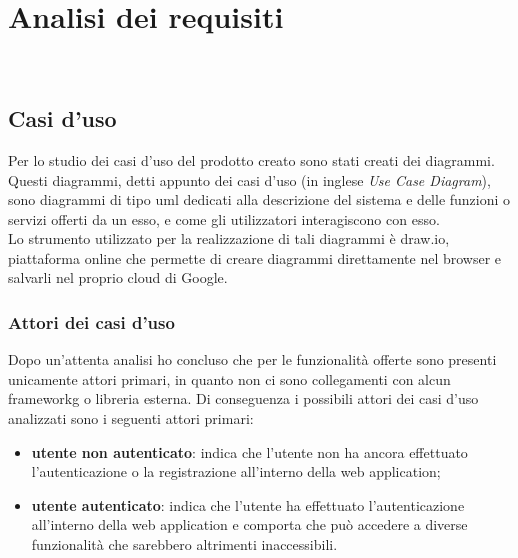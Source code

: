 
\chapter{Analisi dei requisiti}
\label{cap:analisi-requisiti}

\\

\section{Casi d'uso}
\label{sec:casi-uso}

Per lo studio dei casi d'uso del prodotto creato sono stati creati dei diagrammi.
Questi diagrammi, detti appunto dei casi d'uso (in inglese \emph{Use Case Diagram}), sono diagrammi di tipo \gls{uml} dedicati alla descrizione del sistema e delle funzioni o servizi offerti da un esso, e come gli utilizzatori interagiscono con esso.\\
Lo strumento utilizzato per la realizzazione di tali diagrammi è draw.io, piattaforma online che permette di creare diagrammi direttamente nel browser e salvarli nel proprio cloud di Google.

\subsection{Attori dei casi d'uso}
\label{subsec:attori}

Dopo un'attenta analisi ho concluso che per le funzionalità offerte sono presenti unicamente attori primari, in quanto non ci sono collegamenti con alcun \gls{frameworkg} o libreria esterna.
Di conseguenza i possibili attori dei casi d'uso analizzati sono i seguenti attori primari:
\begin{itemize}
	\item \textbf{utente non autenticato}: indica che l'utente non ha ancora effettuato l'autenticazione o la registrazione all'interno della web application;
	\item \textbf{utente autenticato}: indica che l'utente ha effettuato l'autenticazione all'interno della web application e comporta che può accedere a diverse funzionalità che sarebbero altrimenti inaccessibili.
\end{itemize}

